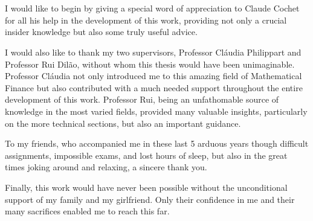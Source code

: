 
\section*{\acknowledgments}

I would like to begin by giving a special word of appreciation to Claude Cochet for all his help in the development of this work, providing not only a crucial insider knowledge but also some truly useful advice.

I would also like to thank my two supervisors, Professor Cláudia Philippart and Professor Rui Dilão, without whom this thesis would have been unimaginable. Professor Cláudia not only introduced me to this amazing field of Mathematical Finance but also contributed with a much needed support throughout the entire development of this work. Professor Rui, being an unfathomable source of knowledge in the most varied fields, provided many valuable insights, particularly on the more technical sections, but also an important guidance.

To my friends, who accompanied me in these last 5 arduous years though difficult assignments, impossible exams, and lost hours of sleep, but also in the great times joking around and relaxing, a sincere thank you.

Finally, this work would have never been possible without the unconditional support of my family and my girlfriend. Only their confidence in me and their many sacrifices enabled me to reach this far.

